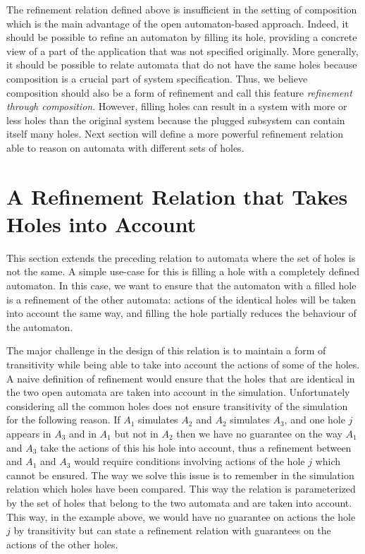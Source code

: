 \documentclass[runningheads]{llncs}
\begin{document}
The refinement relation defined above is insufficient in the setting of composition which is the main advantage of the open automaton-based approach. Indeed, it should be possible to refine an automaton by filling its hole, providing a concrete view of a part of the application that was not specified originally. 
More generally, it should be possible to relate automata that do not have the same holes because composition is a crucial part of system specification.
Thus, we believe composition should also be a form of refinement and call this feature \emph{refinement through composition}.
However, filling holes can result in a system with more or less holes than the original system because the plugged subsystem can contain itself many holes.
Next section will define  a more powerful refinement relation able to reason on automata with different sets of holes.







\section{A Refinement Relation that Takes Holes into Account}\label{sec:holes}

This section  extends the preceding relation to automata where the set of holes is not the same. A simple use-case for this is filling a hole with a completely defined automaton. In this case, we want to ensure that the automaton with a filled hole is a refinement of the other automata: actions of the identical holes will be taken into account the same way, and filling the hole partially reduces the behaviour of the automaton.

The major challenge in the design of this relation is to maintain a form of transitivity while being able to take into account the actions of some of the holes. A naive definition of refinement would ensure that the holes that are identical in the two open automata are taken into account in the simulation. Unfortunately considering all the common holes does not ensure transitivity of the simulation for the following reason. If $A_1$ simulates $A_2$ and $A_2$ simulates $A_3$, and one hole $j$ appears in $A_3$ and in $A_1$ but not in $A_2$ then we have no guarantee on the way $A_1$ and $A_3$ take the actions of this his hole into account, thus  a refinement between and $A_1$ and $A_3$ would require conditions involving actions of the hole $j$ which cannot be ensured. The way we solve this issue is to remember in the simulation relation which holes have been compared. This way the relation is parameterized by the set of holes that belong to the two automata and are taken into account.
This way, in the example above, we would have no guarantee on actions the hole $j$ by transitivity but can state a refinement relation with guarantees on the actions of the other holes.
\end{document}
